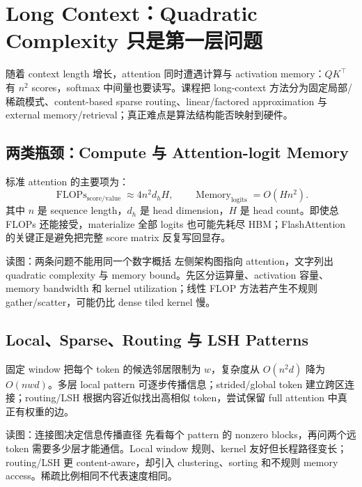 \section{Long Context：Quadratic Complexity 只是第一层问题}

随着 context length 增长，attention 同时遭遇计算与 activation memory：$QK^\top$ 有 $n^2$ scores，softmax 中间量也要读写。课程把 long-context 方法分为固定局部/稀疏模式、content-based sparse routing、linear/factored approximation 与 external memory/retrieval；真正难点是算法结构能否映射到硬件。

\subsection{两类瓶颈：Compute 与 Attention-logit Memory}

标准 attention 的主要项为：
\[
\operatorname{FLOPs}_{\mathrm{score/value}}\approx 4n^2d_hH,
\qquad \operatorname{Memory}_{\mathrm{logits}}=O(Hn^2).
\]
其中 $n$ 是 sequence length，$d_h$ 是 head dimension，$H$ 是 head count。即使总 FLOPs 还能接受，materialize 全部 logits 也可能先耗尽 HBM；FlashAttention 的关键正是避免把完整 score matrix 反复写回显存。


\begin{knowledgebox}{读图：两条问题不能用同一个数字概括}
左侧架构图指向 attention，文字列出 quadratic complexity 与 memory bound。先区分运算量、activation 容量、memory bandwidth 和 kernel utilization；线性 FLOP 方法若产生不规则 gather/scatter，可能仍比 dense tiled kernel 慢。
\end{knowledgebox}

\subsection{Local、Sparse、Routing 与 LSH Patterns}

固定 window 把每个 token 的候选邻居限制为 $w$，复杂度从 $O(n^2d)$ 降为 $O(nwd)$。多层 local pattern 可逐步传播信息；strided/global token 建立跨区连接；routing/LSH 根据内容近似找出高相似 token，尝试保留 full attention 中真正有权重的边。


\begin{knowledgebox}{读图：连接图决定信息传播直径}
先看每个 pattern 的 nonzero blocks，再问两个远 token 需要多少层才能通信。Local window 规则、kernel 友好但长程路径变长；routing/LSH 更 content-aware，却引入 clustering、sorting 和不规则 memory access。稀疏比例相同不代表速度相同。
\end{knowledgebox}

